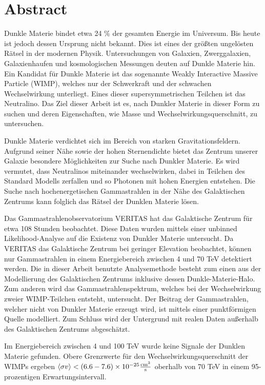 \cleartooddpage[\thispagestyle{empty}]
\section*{Abstract}


Dunkle Materie bindet etwa 24 \% der gesamten Energie im Universum.
Bis heute ist jedoch dessen Ursprung nicht bekannt.
Dies ist eines der gr{\"o}{\ss}ten ungel{\"o}sten  R{\"a}tsel in der modernen Physik.
Untersuchungen von Galaxien, Zwerggalaxien, Galaxienhaufen und kosmologischen Messungen deuten auf Dunkle Materie hin.
Ein Kandidat f{\"u}r Dunkle Materie ist das sogenannte Weakly Interactive Massive Particle (WIMP), welches nur der Schwerkraft und der schwachen Wechselwirkung unterliegt.
Eines dieser supersymmetrischen Teilchen ist das Neutralino.
Das Ziel dieser Arbeit ist es, nach Dunkler Materie in dieser Form zu suchen und deren Eigenschaften, wie Masse und Wechselwirkungsquerschnitt, zu untersuchen.

Dunkle Materie verdichtet sich im Bereich von starken Gravitationsfeldern.
Aufgrund seiner N{\"a}he sowie der hohen Sternendichte bietet das Zentrum unserer Galaxie besondere M{\"o}glichkeiten zur Suche nach Dunkler Materie.
Es wird vermutet, dass Neutralinos miteinander wechselwirken, dabei in Teilchen des Standard Modells zerfallen und so Photonen mit hohen Energien entstehen.
Die Suche nach hochenergetischen Gammastrahlen in der N{\"a}he des Galaktischen Zentrums kann folglich das R{\"a}tsel der Dunklen Materie l{\"o}sen.

Das Gammastrahlenobservatorium VERITAS hat das Galaktische Zentrum f{\"u}r etwa 108 Stunden beobachtet.
Diese Daten wurden mittels einer unbinned Likelihood-Analyse auf die Existenz von Dunkler Materie untersucht.
Da VERITAS das Galaktische Zentrum bei geringer Elevation beobachtet, k{\"o}nnen nur Gammastrahlen in einem Energiebereich zwischen 4 und 70 TeV detektiert werden.
Die in dieser Arbeit benutzte Analysemethode besteht zum einen aus der Modellierung des Galaktischen Zentrums inklusive dessen Dunkle-Materie-Halo.
Zum anderen wird das Gammastrahlenspektrum, welches bei der Wechselwirkung zweier WIMP-Teilchen entsteht, untersucht.
Der Beitrag der Gammastrahlen, welcher nicht von Dunkler Materie erzeugt wird, ist mittels einer punktf{\"o}rmigen Quelle modelliert.
Zum Schluss wird der Untergrund mit realen Daten au{\ss}erhalb des Galaktischen Zentrums abgesch{\"a}tzt.

Im Energiebereich zwischen 4 und 100 TeV wurde keine Signale der Dunklen Materie gefunden.
Obere Grenzwerte f{\"u}r den Wechselwirkungsquerschnitt der WIMPs ergeben ${\left \langle \sigma v \right \rangle < (6.6-7.6) \times 10^{-25} \frac{\mathrm{cm}^3}{\mathrm{s}}}$ oberhalb von 70 TeV in einem 95-prozentigen Erwartungsintervall.





\cleartoevenpage[\thispagestyle{plain}]
\null
